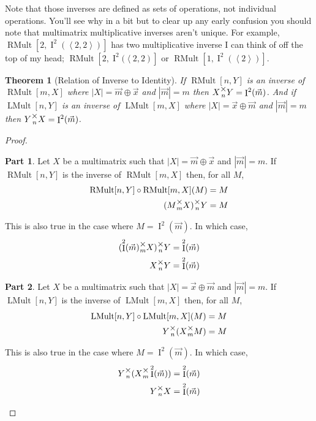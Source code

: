 \documentclass[12pt]{book}
\theoremstyle{plain}
\newtheorem{theorem}{Theorem}[chapter]
\theoremstyle{definition}
\theoremstyle{ppart}
\newtheorem{ppart}{Part}
\theoremstyle{case}
\theoremstyle{solution}
\DeclareMathOperator{\Ident}{I}
\DeclareMathOperator{\RMult}{RMult}
\DeclareMathOperator{\LMult}{LMult}
\newcommand{\mmult}[1]{\text{\raisebox{1ex}{$\underset{#1}{\times}$}}}
\begin{document}
Note that those inverses are defined as sets of operations, not individual operations. 
You'll see why in a bit but to clear up any early confusion you should note that multimatrix
multiplicative inverses aren't unique. For example, $\RMult[2,\Ident^2(\left<2,2\right>)]$ has
two multiplicative inverse I can think of off the top of my head;
$\RMult[2,\Ident^2(\left<2,2\right)]$ or
$\RMult[1,\Ident^2(\left<2\right>)]$.

\begin{theorem}[Relation of Inverse to Identity]
If $\RMult[n,Y]$ is an inverse of $\RMult[m,X]$ where $|X| = \vec{m} \oplus \vec{x}$ and $|\vec{m}| = m$
then $X \mmult{n} Y = \Ident^2(\vec{m})$.
And if $\LMult[n,Y]$ is an inverse of $\LMult[m,X]$ where $|X| = \vec{x} \oplus \vec{m}$ and $|\vec{m}| = m$
then $Y \mmult{n} X = \Ident^2(\vec{m})$.
\end{theorem}
\begin{proof}
\begin{ppart}
Let $X$ be a multimatrix such that $|X| = \vec{m} \oplus \vec{x}$ and $|\vec{m}| = m$.
If $\RMult[n,Y]$ is the inverse of $\RMult[m,X]$ then, for all $M$,
\begin{align*}
  \RMult[n,Y] \circ \RMult[m,X] (M) &= M \\
  (M \mmult{m} X) \mmult{n} Y &= M
\end{align*}

This is also true in the case where $M = \Ident^2(\vec{m})$. In which case,
\begin{align*}
  (\Ident^2(\vec{m}) \mmult{m} X) \mmult{n} Y &= \Ident^2(\vec{m}) \\
  X \mmult{n} Y &= \Ident^2(\vec{m}) \\
\end{align*}
\end{ppart}
\begin{ppart}
Let $X$ be a multimatrix such that $|X| = \vec{x} \oplus \vec{m}$ and $|\vec{m}| = m$.
If $\LMult[n,Y]$ is the inverse of $\LMult[m,X]$ then, for all $M$,
\begin{align*}
  \LMult[n,Y] \circ \LMult[m,X] (M) &= M \\
  Y \mmult{n} (X \mmult{m} M) &= M
\end{align*}

This is also true in the case where $M = \Ident^2(\vec{m})$. In which case,
\begin{align*}
  Y \mmult{n} (X \mmult{m} \Ident^2(\vec{m})) &= \Ident^2(\vec{m}) \\
  Y \mmult{n} X &= \Ident^2(\vec{m})
\end{align*}
\end{ppart}
\end{proof}
\end{document}
